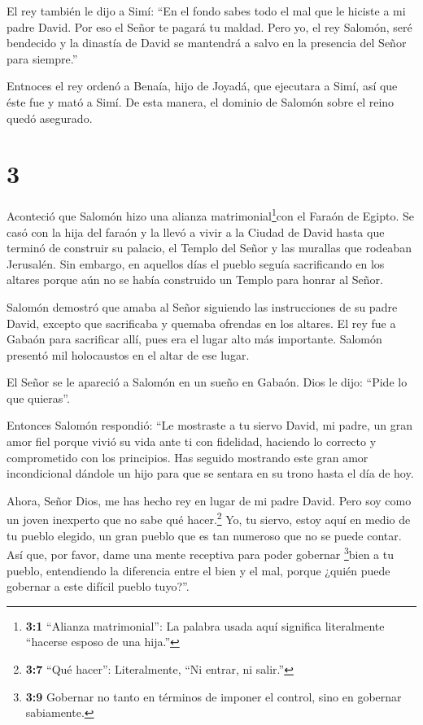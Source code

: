  El rey también le dijo a Simí: ``En el fondo sabes todo el
mal que le hiciste a mi padre David. Por eso el Señor te pagará tu
maldad.  Pero yo, el rey Salomón, seré bendecido y la
dinastía de David se mantendrá a salvo en la presencia del Señor para
siempre.''

 Entnoces el rey ordenó a Benaía, hijo de Joyadá, que
ejecutara a Simí, así que éste fue y mató a Simí. De esta manera, el
dominio de Salomón sobre el reino quedó asegurado.

\hypertarget{section-2}{%
\section{3}\label{section-2}}

 Aconteció que Salomón hizo una alianza
matrimonial\footnote{\textbf{3:1} ``Alianza matrimonial'': La palabra
  usada aquí significa literalmente ``hacerse esposo de una hija.''}con
el Faraón de Egipto. Se casó con la hija del faraón y la llevó a vivir a
la Ciudad de David hasta que terminó de construir su palacio, el Templo
del Señor y las murallas que rodeaban Jerusalén.  Sin
embargo, en aquellos días el pueblo seguía sacrificando en los altares
porque aún no se había construido un Templo para honrar al Señor.

 Salomón demostró que amaba al Señor siguiendo las
instrucciones de su padre David, excepto que sacrificaba y quemaba
ofrendas en los altares.  El rey fue a Gabaón para
sacrificar allí, pues era el lugar alto más importante. Salomón presentó
mil holocaustos en el altar de ese lugar.

 El Señor se le apareció a Salomón en un sueño en Gabaón.
Dios le dijo: ``Pide lo que quieras''.

 Entonces Salomón respondió: ``Le mostraste a tu siervo
David, mi padre, un gran amor fiel porque vivió su vida ante ti con
fidelidad, haciendo lo correcto y comprometido con los principios. Has
seguido mostrando este gran amor incondicional dándole un hijo para que
se sentara en su trono hasta el día de hoy.

 Ahora, Señor Dios, me has hecho rey en lugar de mi padre
David. Pero soy como un joven inexperto que no sabe qué
hacer.\footnote{\textbf{3:7} ``Qué hacer'': Literalmente, ``Ni entrar,
  ni salir.''}  Yo, tu siervo, estoy aquí en medio de tu
pueblo elegido, un gran pueblo que es tan numeroso que no se puede
contar.  Así que, por favor, dame una mente receptiva para
poder gobernar \footnote{\textbf{3:9} Gobernar no tanto en términos de
  imponer el control, sino en gobernar sabiamente.}bien a tu pueblo,
entendiendo la diferencia entre el bien y el mal, porque ¿quién puede
gobernar a este difícil pueblo tuyo?''.

